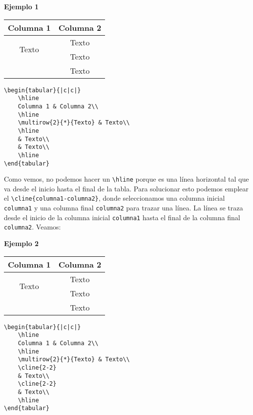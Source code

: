 \textbf{Ejemplo 1}

\begin{center}
	\begin{tabular}{|c|c|}
		\hline
		Columna 1 & Columna 2\\
		\hline
		\multirow{2}{*}{Texto} & Texto\\
		\hline
		& Texto\\
		& Texto\\
		\hline
	\end{tabular}
\end{center}

\begin{myquote}
	\begin{lstlisting}
\begin{tabular}{|c|c|}
	\hline
	Columna 1 & Columna 2\\
	\hline
	\multirow{2}{*}{Texto} & Texto\\
	\hline
	& Texto\\
	& Texto\\
	\hline
\end{tabular}		
	\end{lstlisting}			
\end{myquote}


Como vemos, no podemos hacer un \verb|\hline| porque es una línea horizontal tal que va desde el inicio hasta el final de la tabla. Para solucionar esto podemos emplear el \verb|\cline{columna1-columna2}|, donde seleccionamos una columna inicial \verb|columna1| y una columna final \verb|columna2| para trazar una línea. La línea se traza desde el inicio de la columna inicial \verb|columna1| hasta el final de la columna final \verb|columna2|. Veamos:

\textbf{Ejemplo 2}

\begin{center}
	\begin{tabular}{|c|c|}
		\hline
		Columna 1 & Columna 2\\
		\hline
		\multirow{2}{*}{Texto} & Texto\\
		\cline{2-2}
		& Texto\\ 
		\cline{2-2}
		& Texto\\
		\hline
	\end{tabular}
\end{center}

\begin{myquote}
	\begin{lstlisting}
\begin{tabular}{|c|c|}
	\hline
	Columna 1 & Columna 2\\
	\hline
	\multirow{2}{*}{Texto} & Texto\\
	\cline{2-2}
	& Texto\\ 
	\cline{2-2}
	& Texto\\
	\hline
\end{tabular}		
	\end{lstlisting}			
\end{myquote}


